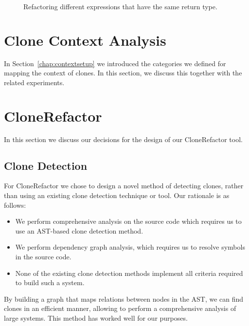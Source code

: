 \begin{figure}[H]
\begin{parcolumns}{2}
\end{parcolumns}
\caption{Refactoring different expressions that have the same return type.}
\label{fig:samereturn}
\end{figure}

\section{Clone Context Analysis}
In Section~\ref{chap:contextsetup} we introduced the categories we defined for mapping the context of clones. In this section, we discuss this together with the related experiments.

\section{CloneRefactor}
In this section we discuss our decisions for the design of our CloneRefactor tool.

\subsection{Clone Detection}
For CloneRefactor we chose to design a novel method of detecting clones, rather than using an existing clone detection technique or tool. Our rationale is as follows:
\begin{itemize}
  \item We perform comprehensive analysis on the source code which requires us to use an AST-based clone detection method.
  \item We perform dependency graph analysis, which requires us to resolve symbols in the source code.
  \item None of the existing clone detection methods implement all criteria required to build such a system.
\end{itemize}
By building a graph that maps relations between nodes in the AST, we can find clones in an efficient manner, allowing to perform a comprehensive analysis of large systems. This method has worked well for our purposes.

